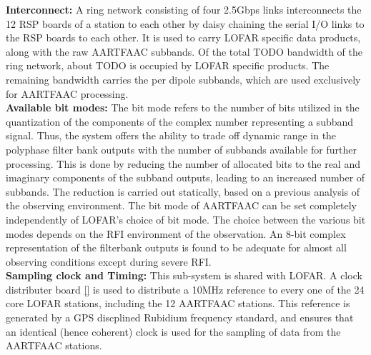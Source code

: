 \documentclass{ws-jai}
\begin{document}


\noindent  \textbf {Interconnect:}  A ring  network consisting  of four  2.5Gbps
links  interconnects the  12 RSP  boards of  a station  to each  other by  daisy
chaining the  serial I/O links to  the RSP boards to  each other. It is  used to
carry LOFAR specific data products, along with the raw AARTFAAC subbands. Of the
total  TODO bandwidth  of the  ring  network, about  TODO is  occupied by  LOFAR
specific  products. The  remaining bandwidth  carries the  per dipole  subbands,
which are used exclusively for AARTFAAC processing.\\

\noindent \textbf  {Available bit modes:} The  bit mode refers to  the number of
bits  utilized in  the  quantization of  the components  of  the complex  number
representing a subband signal.  Thus, the system offers the ability to trade off
dynamic range in  the polyphase filter bank outputs with  the number of subbands
available  for further  processing.   This is  done by  reducing  the number  of
allocated bits  to the  real and  imaginary components  of the  subband outputs,
leading  to an  increased  number  of subbands.  The  reduction  is carried  out
statically, based on a previous analysis  of the observing environment.  The bit
mode of  AARTFAAC can be set  completely independently of LOFAR's  choice of bit
mode. The choice between the various bit modes depends on the RFI environment of
the observation.  An  8-bit complex representation of the  filterbank outputs is
found to  be adequate for almost  all observing conditions except  during severe
RFI.\\


\noindent \textbf  {Sampling clock and  Timing:} This sub-system is  shared with
LOFAR. A clock distributer board \ref{}  is used to distribute a 10MHz reference
to  every  one  of  the  24  core LOFAR  stations,  including  the  12  AARTFAAC
stations. This  reference is  generated by a  GPS discplined  Rubidium frequency
standard, and ensures  that an identical (hence coherent) clock  is used for the
sampling of data from the AARTFAAC stations.\\
\end{document}
